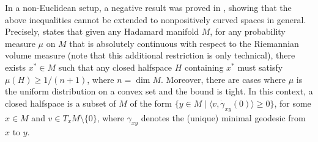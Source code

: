 \documentclass[sts]{imsart}
\theoremstyle{definition}
\theoremstyle{remark}
\newcommand{\R}{\mathbb{R}}
\begin{document}





In a non-Euclidean setup, a negative result was proved in \cite{rusciano2018riemannian}, showing that the above inequalities cannot be extended to nonpositively curved spaces in general.
Precisely, \cite[Theorem 2]{rusciano2018riemannian} states that given any Hadamard manifold $M$, for any probability measure $\mu$ on $M$ that is absolutely continuous with respect to the Riemannian volume measure (note that this additional restriction is only technical), there exists $x^* \in M$ such that any closed halfspace $H$ containing $x^*$ must satisfy $\mu(H) \ge 1/(n+1)$, where $n=\dim M$.
Moreover, there are cases where $\mu$ is the uniform distribution on a convex set and the bound is tight.
In this context, a closed halfspace is a subset of $M$ of the form $\{y \in M \mid \langle v,\dot{\gamma}_{xy}(0) \rangle \ge 0 \}$, for some $x\in M$ and $v \in T_x M\setminus\{0\}$, where $\gamma_{xy}$ denotes the (unique) minimal geodesic from $x$ to $y$.
\end{document}
